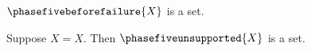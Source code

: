 \begin{signature}\label{phase5_before_failure}
    $\phasefivebeforefailure{X}$ is a set.
\end{signature}

\begin{signature}\label{phase5_unsupported_signature}
    Suppose $X = X$.
    Then $\phasefiveunsupported{X}$ is a set.
\end{signature}
